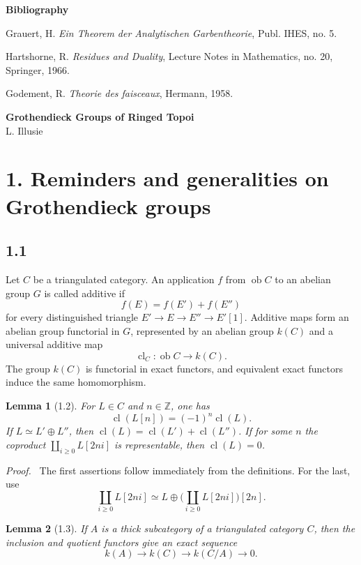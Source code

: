 \documentclass[13pt]{extarticle}
\newcommand{\ZZ}{\mathbb Z}
\newcommand{\ob}{\operatorname{ob}}
\newcommand{\cl}{\operatorname{cl}}
\newenvironment{prooftext}[1][Proof]{\par\noindent\emph{#1.}\ }{\par\medskip}
\newtheorem*{lemma*}{Lemma}
\begin{document}
\begin{center}
\textbf{Bibliography}
\end{center}
Grauert, H. \emph{Ein Theorem der Analytischen Garbentheorie}, Publ. IHES, no. 5.\par
Hartshorne, R. \emph{Residues and Duality}, Lecture Notes in Mathematics, no. 20, Springer, 1966.\par
Godement, R. \emph{Theorie des faisceaux}, Hermann, 1958.

\newpage
\begin{center}
{\Large\textbf{Grothendieck Groups of Ringed Topoi}}\\[0.35em]
{\large L. Illusie}
\end{center}

\section*{1. Reminders and generalities on Grothendieck groups}

\subsection*{1.1}
Let $C$ be a triangulated category. An application $f$ from $\ob C$ to an abelian group $G$ is called additive if
\[
f(E)=f(E')+f(E'')
\]
for every distinguished triangle $E'\to E\to E''\to E'[1]$. Additive maps form an abelian group functorial in $G$, represented by an abelian group $k(C)$ and a universal additive map
\[
\cl_C:\ob C\to k(C).
\]
The group $k(C)$ is functorial in exact functors, and equivalent exact functors induce the same homomorphism.

\begin{lemma*}[1.2]
For $L\in C$ and $n\in\ZZ$, one has
\[
\cl(L[n])=(-1)^n\cl(L).
\]
If $L\simeq L'\oplus L''$, then $\cl(L)=\cl(L')+\cl(L'')$. If for some $n$ the coproduct $\coprod_{i\ge0}L[2ni]$ is representable, then $\cl(L)=0$.
\end{lemma*}

\begin{prooftext}
The first assertions follow immediately from the definitions. For the last, use
\[
\coprod_{i\ge0}L[2ni]\simeq L\oplus\bigl(\coprod_{i\ge0}L[2ni]\bigr)[2n].
\]
\end{prooftext}

\begin{lemma*}[1.3]
If $A$ is a thick subcategory of a triangulated category $C$, then the inclusion and quotient functors give an exact sequence
\[
k(A)\longrightarrow k(C)\longrightarrow k(C/A)\longrightarrow0.
\]
\end{lemma*}
\end{document}
